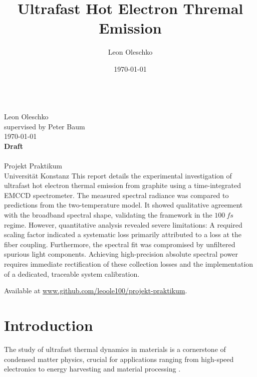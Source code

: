 \documentclass[
	a4paper,
]{scrarticle}
\begin{document}
\author{Leon Oleschko}
\date{\dotdate\today}

\begin{titlepage}
    \sffamily
    \vspace*{3cm}
    {
        \fontsize{32}{32}
        \title{Ultrafast Hot Electron Thremal Emission}
    }
    \vspace{.25cm}\\
    {
        \Large
        Leon Oleschko\\
        supervised by Peter Baum
        \vspace{.05cm}\\
        \dotdate\today\\
        \textbf{Draft}\\
        \vspace{.05cm}\\
        \normalsize
        Projekt Praktikum\\
        Universität Konstanz
    }
    \vfill
    {
        \normalfont\normalsize
        This report details the experimental investigation of ultrafast hot electron thermal emission from graphite using a time-integrated EMCCD spectrometer. The measured spectral radiance was compared to predictions from the two-temperature model. It showed qualitative agreement with the broadband spectral shape, validating the framework in the $\SI{100}{fs}$ regime. 
        However, quantitative analysis revealed severe limitations: A required scaling factor indicated a systematic loss primarily attributed to a loss at the fiber coupling. 
        Furthermore, the spectral fit was compromised by unfiltered spurious light components. 
        Achieving high-precision absolute spectral power requires immediate rectification of these collection losses and the implementation of a dedicated, traceable system calibration.
    }
    \vfill
    \begin{flushright}
        Available at \url{www.github.com/leoole100/projekt-praktikum}.
    \end{flushright}
\end{titlepage}


\clearpage

\section{Introduction}
The study of ultrafast thermal dynamics in materials is a cornerstone of condensed matter physics, crucial for applications ranging from high-speed electronics to energy harvesting and material processing \cite{kampfrathStronglyCoupledOptical2005,vicarelliGrapheneFieldeffectTransistors2012,tangPlasmonicHotElectrons2020,konigHotCarrierSolar2010}. 
\end{document}
